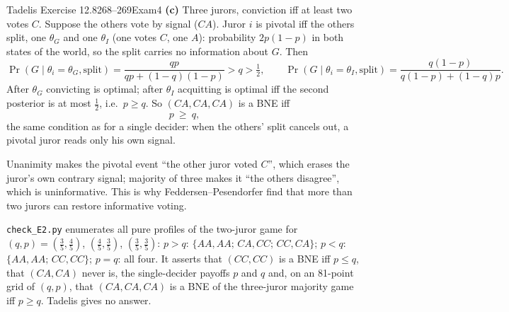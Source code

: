 \begin{exsol}{Tadelis Exercise 12.8}{268--269}{Exam}{4}
\textbf{(c)} Three jurors, conviction iff at least two votes $C$. Suppose the others vote by signal ($CA$).
Juror $i$ is pivotal iff the others split, one $\theta_G$ and one $\theta_I$ (one votes $C$, one $A$): probability $2p(1-p)$
in both states of the world, so the split carries no information about $G$. Then
\[
  \Pr(G\mid\theta_i=\theta_G,\text{split})=\frac{qp}{qp+(1-q)(1-p)}>q>\tfrac12,\qquad
  \Pr(G\mid\theta_i=\theta_I,\text{split})=\frac{q(1-p)}{q(1-p)+(1-q)p}.
\]
After $\theta_G$ convicting is optimal; after $\theta_I$ acquitting is optimal iff the second
posterior is at most $\tfrac12$, i.e.\ $p\ge q$. So $(CA,CA,CA)$ is a BNE iff
\[
  p\ \ge\ q,
\]
the same condition as for a single decider: when the others' split cancels out, a pivotal juror
reads only his own signal.

\interp Unanimity makes the pivotal event ``the other juror voted $C$'', which erases the juror's
own contrary signal; majority of three makes it ``the others disagree'', which is uninformative.
This is why Feddersen--Pesendorfer find that more than two jurors can restore informative voting.

\verify \texttt{check\_E2.py} enumerates all pure profiles of the two-juror game for
$(q,p)=(\tfrac35,\tfrac45)$, $(\tfrac45,\tfrac35)$, $(\tfrac35,\tfrac35)$: $p>q$: $\{AA,AA;\,CA,CC;\,CC,CA\}$;
$p<q$: $\{AA,AA;\,CC,CC\}$; $p=q$: all four. It asserts that $(CC,CC)$ is a BNE iff $p\le q$, that $(CA,CA)$ never is,
the single-decider payoffs $p$ and $q$ and, on an 81-point grid of $(q,p)$, that $(CA,CA,CA)$ is a
BNE of the three-juror majority game iff $p\ge q$. Tadelis gives no answer.

\end{exsol}
